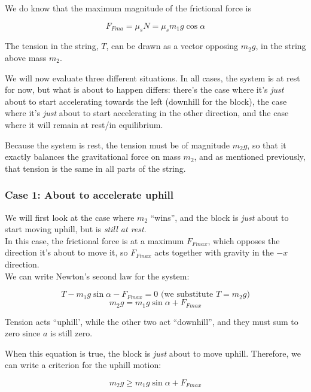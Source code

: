 \documentclass[12pt,a4paper]{report}
\begin{document}
We do know that the maximum magnitude of the frictional force is

\begin{equation}
F_{Fma} = \mu_s N = \mu_s m_1 g \cos \alpha
\end{equation}

The tension in the string, $T$, can be drawn as a vector opposing $m_2 g$, in the string above mass $m_2$.

We will now evaluate three different situations. In all cases, the system is at rest for now, but what is about to happen differs: there's the case where it's \emph{just} about to start accelerating towards the left (downhill for the block), the case where it's \emph{just} about to start accelerating in the other direction, and the case where it will remain at rest/in equilibrium.

Because the system is rest, the tension must be of magnitude $m_2 g$, so that it exactly balances the gravitational force on mass $m_2$, and as mentioned previously, that tension is the same in all parts of the string.

\subsubsection{Case 1: About to accelerate uphill}

We will first look at the case where $m_2$ ``wins'', and the block is \emph{just} about to start moving uphill, but is \emph{still at rest}.\\
In this case, the frictional force is at a maximum $F_{Fmax}$, which opposes the direction it's about to move it, so $F_{Fmax}$ acts together with gravity in the $-x$ direction.\\
We can write Newton's second law for the system:

\begin{equation}
T - m_1 g \sin \alpha - F_{Fmax} = 0\text{ (we substitute $T = m_2  g$)}
\end{equation}
\begin{equation}
m_2 g = m_1 g \sin \alpha + F_{Fmax}
\end{equation}

Tension acts ``uphill', while the other two act ``downhill'', and they must sum to zero since $a$ is still zero.

When this equation is true, the block is \emph{just} about to move uphill. Therefore, we can write a criterion for the uphill motion:

\begin{equation}
m_2 g \ge m_1 g \sin \alpha + F_{Fmax}
\end{equation}
\end{document}
